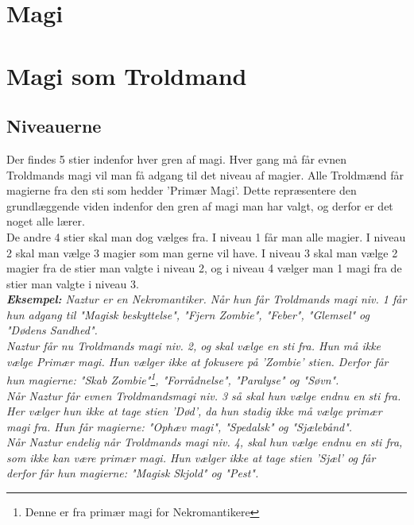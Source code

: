 \chapter{Magi}



\chapter{Magi som Troldmand}

\section{Niveauerne}
Der findes 5 stier indenfor hver gren af magi. Hver gang må får evnen Troldmands magi vil man få adgang til det niveau af magier. Alle Troldmænd får magierne fra den sti som hedder 'Primær Magi'. Dette repræsentere den grundlæggende viden indenfor den gren af magi man har valgt, og derfor er det noget alle lærer.\\
De andre 4 stier skal man dog vælges fra. I niveau 1 får man alle magier. I niveau 2 skal man vælge 3 magier som man gerne vil have. I niveau 3 skal man vælge 2 magier fra de stier man valgte i niveau 2, og i niveau 4 vælger man 1 magi fra de stier man valgte i niveau 3. \\
\textit{\textbf{Eksempel:} Naztur er en Nekromantiker. Når hun får Troldmands magi niv. 1 får hun adgang til "Magisk beskyttelse", "Fjern Zombie", "Feber", "Glemsel" og "Dødens Sandhed".\\ Naztur får nu Troldmands magi niv. 2, og skal vælge en sti fra. Hun må ikke vælge Primær magi. Hun vælger ikke at fokusere på 'Zombie' stien. Derfor får hun magierne: "Skab Zombie"\footnote{Denne er fra primær magi for Nekromantikere}, "Forrådnelse", "Paralyse" og "Søvn".\\ Når Naztur får evnen Troldmandsmagi niv. 3 så skal hun vælge endnu en sti fra. Her vælger hun ikke at tage stien 'Død', da hun stadig ikke må vælge primær magi fra. Hun får magierne: "Ophæv magi", "Spedalsk" og "Sjælebånd".\\
Når Naztur endelig når Troldmands magi niv. 4, skal hun vælge endnu en sti fra, som ikke kan være primær magi. Hun vælger ikke at tage stien 'Sjæl' og får derfor får hun magierne: "Magisk Skjold" og "Pest".}


